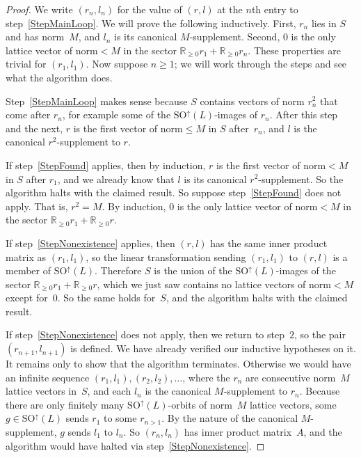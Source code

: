 \documentclass[12pt]{amsart}
\def\R{\mathbb{R}}
\def\SO{\mathrm{SO}}
\def\SOup{\SO^{\uparrow}}
\def\SOup{\mathrm{SO}^{\uparrow}}
\numberwithin{theorem}{section}
\numberwithin{equation}{section}
\numberwithin{figure}{section}
\theoremstyle{remark}
\begin{document}
\begin{proof}
	We write $(r_n,l_n)$ for the value of $(r,l)$ at the $n$th entry to step~\ref{StepMainLoop}.
	We will prove the following inductively.  First, $r_n$ lies in $S$ and has norm~$M$, 
  and $l_n$ is its canonical $M$-supplement.  Second, $0$ is the only
    lattice vector of norm${}<M$ in the
    sector $\R_{\geq0} r_1+\R_{\geq0} r_n$.
	These properties are trivial for $(r_1,l_1)$.  Now suppose $n\geq1$; we will work through
    the steps and see what the algorithm does.

	Step~\ref{StepMainLoop} makes sense because $S$ contains vectors of norm $r_n^2$ that
    come after $r_n$, 
    for example some of the $\SOup(L)$-images of $r_n$.  After this step and the next,
    $r$ is the first vector of norm${}\leq M$ in $S$ after~$r_n$, and $l$ is the 
    canonical $r^2$-supplement to $r$.

    If step~\ref{StepFound} applies, then by induction, $r$ is the first vector of
    norm${}<M$ in $S$ after $r_1$, and we already know that $l$ is its canonical
    $r^2$-supplement.  So the algorithm halts with the claimed result.  So suppose
    step~\ref{StepFound} does not apply.  That is, $r^2=M$.  By induction,
    $0$ is the only lattice vector of norm${}<M$ in the sector $\R_{\geq0}r_1+\R_{\geq0}r$.

    If step~\ref{StepNonexistence} applies, then $(r,l)$ has the same inner product
    matrix as $(r_1,l_1)$, so the linear transformation sending $(r_1,l_1)$ to $(r,l)$
    is a member of $\SOup(L)$.
    Therefore $S$ is the union of the $\SOup(L)$-images of the sector $\R_{\geq0}r_1+\R_{\geq0}r$,
    which we just saw  contains no lattice vectors of norm${}<M$ except for~$0$.
    So the same holds for~$S$, and  the algorithm halts with the claimed result.

    If step~\ref{StepNonexistence} does not apply, then we return to step~$2$,
    so the pair $(r_{n+1},l_{n+1})$ is defined.  We have already verified our
    inductive hypotheses on it.  It remains only to show that the algorithm terminates.
    Otherwise we would have an infinite sequence $(r_1,l_1),(r_2,l_2),\dots$,
    where the $r_n$ are consecutive norm~$M$ lattice vectors in~$S$, and each $l_n$
    is the canonical $M$-supplement to $r_n$.  Because there are only finitely
     many $\SOup(L)$-orbits of norm~$M$
    lattice vectors, some $g\in\SOup(L)$ sends $r_1$ to some $r_{n>1}$.  By the nature
    of the canonical $M$-supplement, $g$ sends $l_1$ to $l_n$.  So $(r_n,l_n)$
    has inner product matrix~$A$, and the algorithm would have halted via step~\ref{StepNonexistence}. 
\end{proof}
\end{document}
